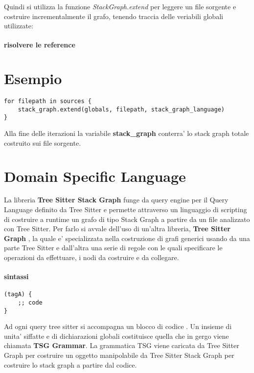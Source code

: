 Quindi si utilizza la funzione \emph{StackGraph.extend} per leggere un file sorgente e costruire incrementalmente il grafo, tenendo traccia delle veriabili globali utilizzate:

\paragraph{risolvere le reference}

\section{Esempio}

\begin{Verbatim}[samepage=true]
for filepath in sources {
    stack_graph.extend(globals, filepath, stack_graph_language)
}
\end{Verbatim}

Alla fine delle iterazioni la variabile \textbf{stack\_graph} conterra' lo stack graph totale costruito sui file sorgente.

\section{Domain Specific Language}

La libreria \textbf{Tree Sitter Stack Graph} \cite{TreeSitterStackGraph} funge da query engine per il Query Language definito da Tree Sitter e permette attraverso un linguaggio di scripting di costruire a runtime un grafo di tipo Stack Graph a partire da un file analizzato con Tree Sitter.
Per farlo si avvale dell'uso di un'altra libreria, \textbf{Tree Sitter Graph} \cite{TreeSitterGraph}, la quale e' specializzata nella costruzione di grafi generici usando da una parte Tree Sitter e dall'altra una serie di regole con le quali specificare le operazioni da effettuare, i nodi da costruire e da collegare.

\paragraph{sintassi}

\begin{Verbatim}[samepage=true]
(tagA) {
    ;; code
}
\end{Verbatim}

Ad ogni query tree sitter si accompagna un blocco di codice \cite{TreeSitterGraphReferenceHighLevelStructure}.
Un insieme di unita' siffatte e di dichiarazioni globali costituisce quella che in gergo viene chiamata \textbf{TSG Grammar}.
La grammatica TSG viene caricata da Tree Sitter Graph per costruire un oggetto manipolabile da Tree Sitter Stack Graph per costruire lo stack graph a partire dal codice.

